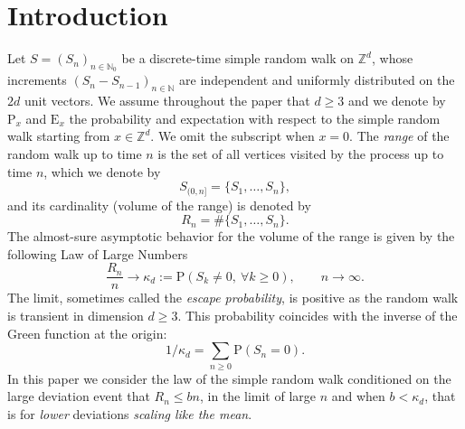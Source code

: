 \documentclass[a4paper,11pt]{amsart}
\numberwithin{equation}{section}
\newcommand{\bbN}{{\ensuremath{\mathbb N}} }
\newcommand{\bbZ}{{\ensuremath{\mathbb Z}} }
\newcommand{\gk}{\kappa}
\newcommand\bP{\ensuremath{\mathrm{P}}}
\newcommand\bE{\ensuremath{\mathrm{E}}}
\newcommand{\8}{\infty}
\newcommand{\beq}{\begin{equation}}
\newcommand{\eeq}{\end{equation}}
\begin{document}
\tableofcontents
\section{Introduction}
\par  Let $S=(S_n)_{n\in\bbN_0}$ be a discrete-time simple random walk on $\bbZ^d$, whose increments $(S_n - S_{n-1})_{n\in \bbN}$ are independent and uniformly distributed on the $2d$ unit vectors. We assume throughout the paper that $d\ge 3$ and we denote by $\bP_x$ and $\bE_x$ the probability and expectation with respect to the simple random walk starting from $x\in \bbZ^d$. We omit the subscript when $x=0$. The {\it range} of the random walk up to time $n$ is the set of all vertices visited by the process up to time $n$, which we denote by
\beq
S_{(0,n]} = \{S_1, \ldots, S_n\},
\eeq
and its cardinality (volume of the range) is denoted by
\beq
R_n = \#\{S_1, \ldots, S_n\}.
\eeq
The almost-sure asymptotic behavior for the volume of the range is given by the following Law of Large Numbers~\cite{DE51}
\beq
\label{eq:LLN-range}
\frac{R_n}{n} \longrightarrow \gk_d := 
\bP(S_k \neq 0,\ \forall k\ge 0),
\qquad n\to \infty.
\eeq
The limit, sometimes called the {\it escape probability}, is positive as the random walk is transient in dimension $d\ge 3$. This probability coincides with the inverse of the Green function at the origin:
\beq
1/\gk_d = \sum_{n\ge 0} \bP(S_n = 0).
\eeq
In this paper we consider the law of the simple random walk conditioned on the large deviation event that $R_n \le bn$, in the limit of large $n$ and when $b< \gk_d$, that is for {\it lower} deviations {\it scaling like the mean}.
%
\end{document}
